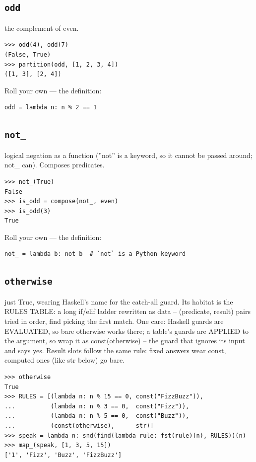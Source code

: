 \documentclass[10pt,letterpaper]{book}
\begin{document}
\subsection{\texttt{odd}}\label{def:odd}
the complement of even.
\begin{lstlisting}[style=ex]
>>> odd(4), odd(7)
(False, True)
>>> partition(odd, [1, 2, 3, 4])
([1, 3], [2, 4])
\end{lstlisting}

Roll your own --- the definition:

\begin{lstlisting}[style=ex]
odd = lambda n: n % 2 == 1
\end{lstlisting}

\subsection{\texttt{not\_}}\label{def:not-}
logical negation as a function (''not'' is a keyword, so it cannot be passed around; not\_ can). Composes predicates.
\begin{lstlisting}[style=ex]
>>> not_(True)
False
>>> is_odd = compose(not_, even)
>>> is_odd(3)
True
\end{lstlisting}

Roll your own --- the definition:

\begin{lstlisting}[style=ex]
not_ = lambda b: not b  # `not` is a Python keyword
\end{lstlisting}

\subsection{\texttt{otherwise}}\label{def:otherwise}
just True, wearing Haskell's name for the catch-all guard. Its habitat is the RULES TABLE: a long if/elif ladder rewritten as data -- (predicate, result) pairs tried in order, find picking the first match. One care: Haskell guards are EVALUATED, so bare otherwise works there; a table's guards are APPLIED to the argument, so wrap it as const(otherwise) -- the guard that ignores its input and says yes. Result slots follow the same rule: fixed answers wear const, computed ones (like str below) go bare.
\begin{lstlisting}[style=ex]
>>> otherwise
True
>>> RULES = [(lambda n: n % 15 == 0, const("FizzBuzz")),
...          (lambda n: n % 3 == 0,  const("Fizz")),
...          (lambda n: n % 5 == 0,  const("Buzz")),
...          (const(otherwise),      str)]
>>> speak = lambda n: snd(find(lambda rule: fst(rule)(n), RULES))(n)
>>> map_(speak, [1, 3, 5, 15])
['1', 'Fizz', 'Buzz', 'FizzBuzz']
\end{lstlisting}
\end{document}
